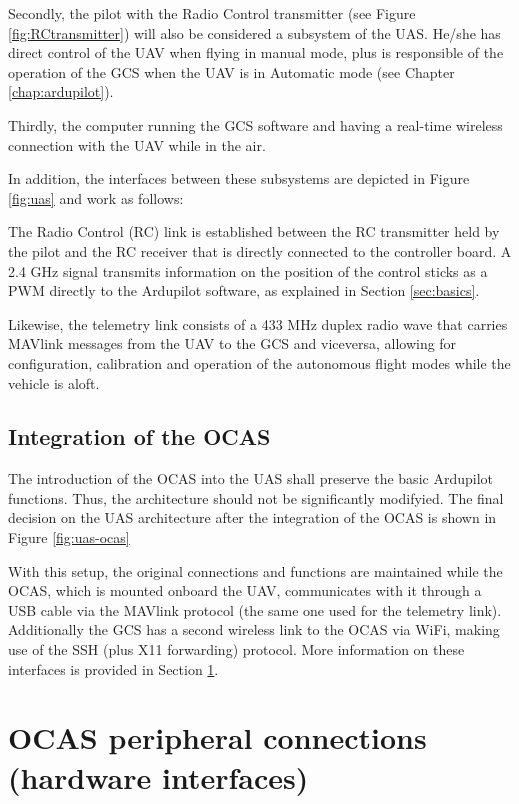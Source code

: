 Secondly, the pilot with the Radio Control transmitter (see Figure \ref{fig:RCtransmitter}) will also be considered a subsystem of the UAS.
He/she has direct control of the UAV when flying in manual mode, plus is responsible of the operation of the GCS when the UAV is in Automatic mode (see Chapter \ref{chap:ardupilot}).

Thirdly, the computer running the GCS software and having a real-time wireless connection with the UAV while in the air.



In addition, the interfaces between these subsystems are depicted in Figure \ref{fig:uas} and work as follows:

The Radio Control (RC) link is established between the RC transmitter held by the pilot and the RC receiver that is directly connected to the controller board.
A 2.4 GHz signal transmits information on the position of the control sticks as a PWM directly to the Ardupilot software, as explained in Section \ref{sec:basics}.

Likewise, the telemetry link consists of a 433 MHz duplex radio wave that carries MAVlink messages from the UAV to the GCS and viceversa, allowing for configuration, calibration and operation of the autonomous flight modes while the vehicle is aloft.

\subsection{Integration of the OCAS}

The introduction of the OCAS into the UAS shall preserve the basic Ardupilot functions.
Thus, the architecture should not be significantly modifyied.
The final decision on the UAS architecture after the integration of the OCAS is shown in Figure \ref{fig:uas-ocas}



With this setup, the original connections and functions are maintained while the OCAS, which is mounted onboard the UAV, communicates with it through a USB cable via the MAVlink protocol (the same one used for the telemetry link).
Additionally the GCS has a second wireless link to the OCAS via WiFi, making use of the SSH (plus X11 forwarding) protocol.
More information on these interfaces is provided in Section \ref{sec:peripheral}.

\section{OCAS peripheral connections (hardware interfaces)} \label{sec:peripheral}

